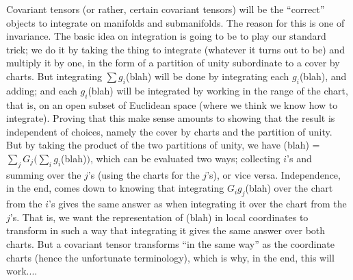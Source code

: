 Covariant tensors (or rather, certain covariant tensors) will be the ``correct'' objects
to integrate on manifolds and submanifolds. The reason for this is one of 
invariance. The basic idea on integration is going to be to play our standard
trick; we do it by taking the thing to integrate (whatever it turns out to be) and multiply it by one,
in the form of a partition of unity subordinate to a cover by charts. But integrating
$\sum g_i$(blah) will be done by integrating each $g_i$(blah), and adding; and each 
$g_i$(blah) will be integrated by working in the range of the chart, that is,
on an open subset of Euclidean space (where we think we know how to integrate).
Proving that this make sense amounts to showing that the result is independent of
choices, namely the cover by charts and the partition of unity. But by taking the product of
the two partitions of unity, we have (blah) = $\sum_jG_j(\sum_ig_i$(blah)$)$, which 
can be evaluated two ways; collecting $i$'s and summing over the $j$'s (using the charts for the $j$'s),
or vice versa. Independence, in the end, comes down to knowing that integrating
$G_ig_j$(blah) over the chart from the $i$'s gives the same answer as when integrating it over
the chart from the $j$'s. That is, we want the representation of (blah) in local coordinates
to transform in such a way that integrating it gives the same answer over both charts. But a
covariant tensor transforms ``in the same way'' as the coordinate charts (hence the unfortunate
terminology), which is why, in the end, this will work....

\msk

